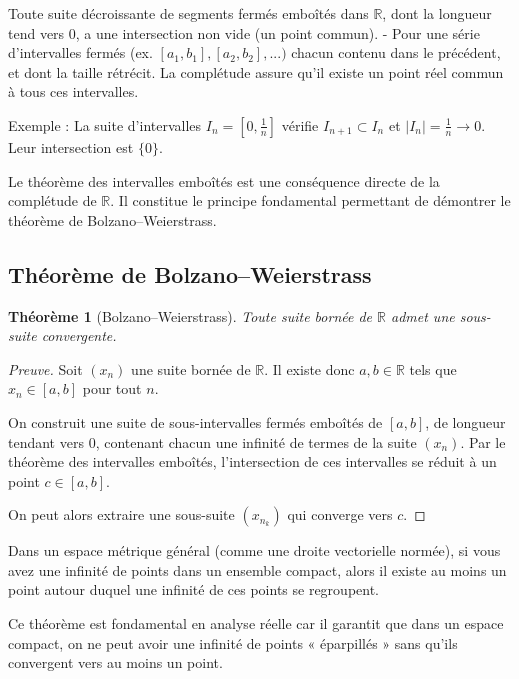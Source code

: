 \documentclass{report} %
\theoremstyle{definition}  %
\theoremstyle{plain} %
\newtheorem{theorem}{Théorème}[chapter]
\theoremstyle{remark} %
\begin{document}
\medskip
Toute suite décroissante de segments fermés emboîtés dans \(\mathbb{R}\), 
dont la longueur tend vers 0, a une intersection non vide (un point commun). -
Pour une série d’intervalles fermés (ex. \([a_1, b_1], [a_2, b_2], ...)\) chacun contenu dans le précédent, et dont la taille rétrécit. 
La complétude assure qu’il existe un point réel commun à tous ces intervalles.
\medskip

\noindent
Exemple : La suite d'intervalles \(I_n = [0, \frac{1}{n}]\) 
vérifie \(I_{n+1} \subset I_n\) et \(|I_n| = \frac{1}{n} \to 0\). Leur intersection est \(\{0\}\).

\medskip

\noindent
Le théorème des intervalles emboîtés est une conséquence directe de la
complétude de \(\mathbb{R}\).
Il constitue le principe fondamental permettant de démontrer le théorème
de Bolzano--Weierstrass.


\bigskip

\subsection{\textbf{Théorème de Bolzano--Weierstrass}}

\begin{theorem}[Bolzano--Weierstrass]
Toute suite bornée de \(\mathbb{R}\) admet une sous-suite convergente.
\end{theorem}

\begin{proof}[Preuve]
Soit \((x_n)\) une suite bornée de \(\mathbb{R}\).
Il existe donc \(a,b \in \mathbb{R}\) tels que \(x_n \in [a,b]\) pour tout \(n\).

On construit une suite de sous-intervalles fermés emboîtés de \([a,b]\),
de longueur tendant vers \(0\), contenant chacun une infinité de termes
de la suite \((x_n)\).
Par le théorème des intervalles emboîtés, l’intersection de ces intervalles
se réduit à un point \(c \in [a,b]\).

On peut alors extraire une sous-suite \((x_{n_k})\) qui converge vers \(c\).
\end{proof}

\medskip

Dans un espace métrique général (comme une droite vectorielle normée),
si vous avez une infinité de points dans un ensemble compact,
alors il existe au moins un point autour duquel
une infinité de ces points se regroupent.

Ce théorème est fondamental en analyse réelle
car il garantit que dans un espace compact,
on ne peut avoir une infinité de points « éparpillés » sans qu’ils
convergent vers au moins un point.
\end{document}
